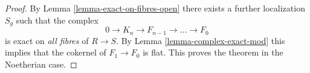 \documentclass[10pt,a4paper]{amsart}
\theoremstyle{plain}
\theoremstyle{definition}
\theoremstyle{remark}
\numberwithin{equation}{subsection}
\begin{document}
\begin{proof}
\medskip\noindent
By Lemma \ref{lemma-exact-on-fibres-open}
there exists a further localization $S_g$ such that
the complex
$$
0 \to K_n \to F_{n-1} \to \ldots \to F_0
$$
is exact on {\it all fibres} of $R \to S$. By
Lemma \ref{lemma-complex-exact-mod}
this implies that the cokernel of $F_1 \to F_0$ is
flat. This proves the theorem in the Noetherian case.
\end{proof}



\end{document}
